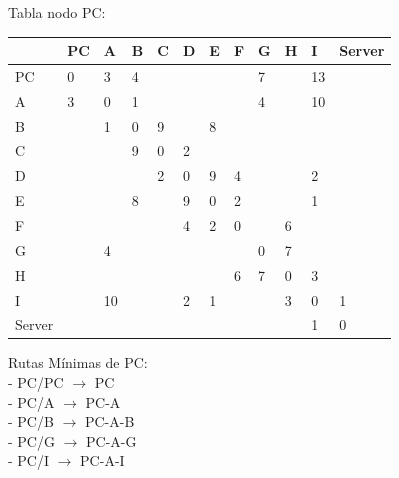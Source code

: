 \documentclass[a4paper]{article}
\begin{document}
\begin{table}[ht]
Tabla nodo PC:\\
\begin{tabular}{|l|l|l|l|l|l|l|l|l|l|l|l|}
\hline
       & PC & A  & B & C & D & E & F & G & H & I  & Server \\ \hline
PC     & 0  & 3  & 4 &   &   &   &   & 7 &   & 13 &        \\ \hline
A      & 3  & 0  & 1 &   &   &   &   & 4 &   & 10 &        \\ \hline
B      &    & 1  & 0 & 9 &   & 8 &   &   &   &    &        \\ \hline
C      &    &    & 9 & 0 & 2 &   &   &   &   &    &        \\ \hline
D      &    &    &   & 2 & 0 & 9 & 4 &   &   & 2  &        \\ \hline
E      &    &    & 8 &   & 9 & 0 & 2 &   &   & 1  &        \\ \hline
F      &    &    &   &   & 4 & 2 & 0 &   & 6 &    &        \\ \hline
G      &    & 4  &   &   &   &   &   & 0 & 7 &    &        \\ \hline
H      &    &    &   &   &   &   & 6 & 7 & 0 & 3  &        \\ \hline
I      &    & 10 &   &   & 2 & 1 &   &   & 3 & 0  & 1      \\ \hline
Server &    &    &   &   &   &   &   &   &   & 1  & 0      \\ \hline
\end{tabular}

Rutas Mínimas de PC:\\
-	PC/PC  $\rightarrow$ PC\\
-	PC/A  $\rightarrow$  PC-A\\
-	PC/B  $\rightarrow$  PC-A-B\\
-	PC/G  $\rightarrow$  PC-A-G\\
-	PC/I  $\rightarrow$  PC-A-I\\

\end{table}
\end{document}
